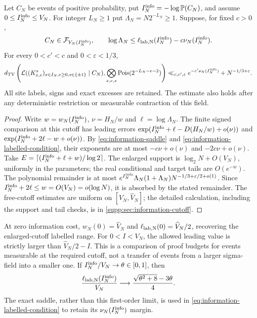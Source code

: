 \begin{proposition}
\label{prop:information-labelled}
Let $C_N$ be events of positive probability, put
$I_N^{\rm info}=-\log\mathbb P(C_N)$, and assume $0\le I_N^{\rm info}\le V_N$. For integer
$L_N\ge1$ put $\Lambda_N=N2^{-L_N}\ge1$. Suppose, for fixed $c>0$,
\begin{equation}\label{eq:information-labelled-condition}
 C_N\in\mathcal F_{Y_N(I_N^{\rm info})},\qquad
 \log\Lambda_N\le\ell_{\rm lab,N}(I_N^{\rm info})-c\nu_N(I_N^{\rm info}).
\end{equation}
For every $0<c'<c$ and $0<\varepsilon<1/3$,
\begin{equation}\label{eq:information-labelled-rate}
 d_{\mathrm{TV}}\left(\mathcal L((K^s_{x,e})_{x\in I_N,e\ge0,s\in\{\pm1\}}\mid C_N),
       \bigotimes_{x,e,s}\operatorname{Pois}(2^{-L_N-e-2})\right)
 \ll_{c,c',\varepsilon} e^{-c'\nu_N(I_N^{\rm info})}+N^{-1/3+\varepsilon}.
\end{equation}
All site labels, signs and exact excesses are retained. The estimate
also holds after any deterministic restriction or measurable contraction
of this field.
\end{proposition}
\begin{proof}
Write $w=w_N(I_N^{\rm info})$, $\nu=H_N/w$ and $\ell=\log\Lambda_N$.
The finite signed comparison at this cutoff has leading errors
$\exp(I_N^{\rm info}+\ell-D(H_N/w)+o(\nu))$ and
$\exp(I_N^{\rm info}+2\ell-w+o(\nu))$.
By \eqref{eq:information-saddle} and
\eqref{eq:information-labelled-condition}, their exponents are at most
$-c\nu+o(\nu)$ and $-2c\nu+o(\nu)$.
Take $E=\lceil(I_N^{\rm info}+\ell+w)/\log2\rceil$. The enlarged support is
$\log_2N+O(V_N)$, uniformly in the parameters; the real conditional and
target tails are $O(e^{-w})$. The polynomial remainder is at most
$e^{I_N^{\rm info}}\Lambda_N(1+\Lambda_N)N^{-1/3+\varepsilon/2+o(1)}$.
Since $I_N^{\rm info}+2\ell\le w=O(V_N)=o(\log N)$, it is absorbed by the
stated remainder. The free-cutoff estimates are uniform on
$[V_N,\widehat V_N]$; the detailed calculation, including the support
and tail checks, is in \cref{supp:sec:information-cutoff}.
\end{proof}
At zero information cost, $w_N(0)=\widehat V_N$ and
$\ell_{\rm lab,N}(0)=\widehat V_N/2$, recovering the enlarged-cutoff
labelled range. For $0<I<V_N$, the allowed leading value is strictly
larger than $\widehat V_N/2-I$. This is a comparison of proof budgets
for events measurable at the required cutoff, not a transfer of events
from a larger sigma-field into a smaller one. If $I_N^{\rm info}/V_N\to\theta\in[0,1]$,
then
\begin{equation}\label{eq:information-leading}
 \frac{\ell_{\rm lab,N}(I_N^{\rm info})}{V_N}
       \longrightarrow\frac{\sqrt{\theta^2+8}-3\theta}{4}.
\end{equation}
The exact saddle, rather than this first-order limit, is used in
\eqref{eq:information-labelled-condition} to retain its $\nu_N(I_N^{\rm info})$
margin.

